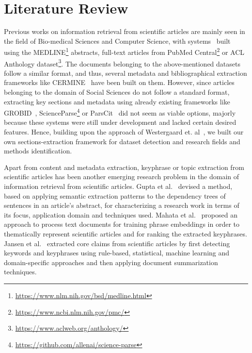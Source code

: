 \documentclass[runningheads]{llncs}
\begin{document}

\section{Literature Review}
Previous works on information retrieval from scientific articles are mainly seen in the field of Bio-medical Sciences and Computer Science, with systems~\cite{DBLP:journals/ploscb/WestergaardSTJB18} built using the MEDLINE\footnote{\url{https://www.nlm.nih.gov/bsd/medline.html}} abstracts, full-text articles from PubMed Central\footnote{\url{https://www.ncbi.nlm.nih.gov/pmc/}} or ACL Anthology
dataset\footnote{\url{https://www.aclweb.org/anthology/}}. The documents belonging to the above-mentioned datasets follow a similar format, and thus, several metadata and bibliographical extraction frameworks like CERMINE~\cite{tkaczyk2014cermine} have been built on them. However, since articles belonging to the domain of Social Sciences do not follow a standard format, extracting key sections and metadata using already existing frameworks like GROBID~\cite{lopez2009grobid}, ScienceParse\footnote{\url{https://github.com/allenai/science-parse}} or ParsCit~\cite{councill2008parscit} did not seem as viable options, majorly because these systems were still under development and lacked certain desired features. Hence, building upon the approach of Westergaard et. al~\cite{DBLP:journals/ploscb/WestergaardSTJB18}, we built our own sections-extraction framework for dataset detection and research fields and methods identification.

Apart from content and metadata extraction, keyphrase or topic extraction from scientific articles has been another emerging research problem in the domain of information retrieval from scientific articles. Gupta et al.~\cite{gupta2011analyzing} devised a method, based on applying semantic extraction patterns to the dependency trees of sentences in an article's abstract, for characterizing a research work in terms of its focus, application domain and techniques used. Mahata et al.~\cite{mahata2018key2vec} proposed an approach to process text documents for training phrase embeddings in order to thematically represent scientific articles and for ranking the extracted keyphrases. Jansen et al.~\cite{jansen2016extracting} extracted core claims from scientific articles by first detecting keywords and keyphrases using rule-based, statistical, machine learning and domain-specific approaches and then applying document summarization techniques.
\end{document}
